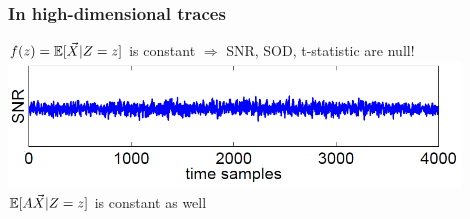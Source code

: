 \begin{frame}
\frametitle{In high-dimensional traces}
$f(z) = \mathbb{E}[\vec{X}\lvert Z=z]$ is constant $\Rightarrow$ SNR, SOD, t-statistic are null!
\includegraphics[width = 0.9\textwidth]{figures/SNR_2order_new.png} \\
\pause
$\mathbb{E}[A\vec{X}\lvert Z=z]$ is constant as well 
\end{frame}
